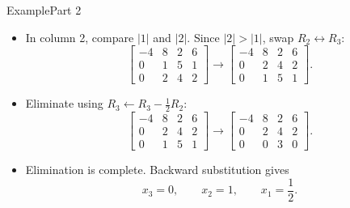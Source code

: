 \documentclass[10pt]{beamer}
\begin{document}
\begin{frame}{Example}{Part 2}

\begin{itemize}
    \item In column 2, compare $|1|$ and $|2|$.
    Since $|2|>|1|$, swap $R_2\leftrightarrow R_3$:
    \[
    \left[
    \begin{array}{rrr|r}
        -4&8&2&6\\
        0&\boxed{1}&5&1\\
        0&2&4&2
    \end{array}
    \right]
    \longrightarrow
    \left[
    \begin{array}{rrr|r}
        -4&8&2&6\\
        0&\boxed{2}&4&2\\
        0&1&5&1
    \end{array}
    \right].
    \]

    \item Eliminate using
    $R_3\leftarrow R_3-\frac12R_2$:
    \[
    \left[
    \begin{array}{rrr|r}
        -4&8&2&6\\
        0&\boxed{2}&4&2\\
        0&1&5&1
    \end{array}
    \right]
    \longrightarrow
    \left[
    \begin{array}{rrr|r}
        -4&8&2&6\\
        0&2&4&2\\
        0&0&\boxed{3}&0
    \end{array}
    \right].
    \]

    \vfill

    \item Elimination is complete. Backward substitution gives
    \[
        x_3=0,\qquad x_2=1,\qquad x_1=\frac12.
    \]
\end{itemize}

\end{frame}
\end{document}
